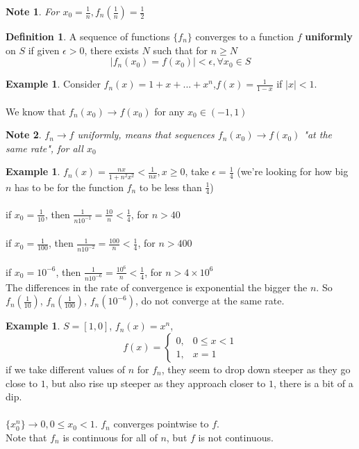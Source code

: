 \documentclass[12pt]{article}
\theoremstyle{plain}
\newtheorem*{note}{Note}
\theoremstyle{definition}
\newtheorem{definition}[theorem]{Definition}
\newtheorem{example}[theorem]{Example}
\begin{document}
\begin{note}
	For $x_0 = \frac{1}{n}, f_n (\frac{1}{n}) = \frac{1}{2}$
\end{note}

\begin{definition}
	A sequence of functions $\{ f_n \}$ converges to a function $f$ \textbf{uniformly} on $S$ if given $\epsilon > 0$, there exists $N$ such that for $n \geq N$
	$$|f_n (x_0) = f(x_0)| < \epsilon, \forall x_0 \in S$$
\end{definition}

\begin{example}
	Consider $f_n (x) = 1+ x + ... + x^n$,$ f(x)=\frac{1}{1-x}$ if $|x| < 1$.\\
	\\
	We know that $f_n (x_0) \to f(x_0)$ for any $x_0 \in (-1, 1)$
\end{example}

\begin{note}
	$f_n \to f$ uniformly, means that sequences $f_n (x_0) \to f(x_0)$ "at the same rate", for all $x_0$
\end{note}

\begin{example}
	$f_n (x) =  \frac{nx}{1 + n^2 x^2} < \frac{1}{nx}, x \geq 0$, take $\epsilon = \frac{1}{4}$
	(we're looking for how big $n$ has to be for the function $f_n$ to be less than $\frac{1}{4}$)\\
	\\
	if $x_0 = \frac{1}{10}$, then $\frac{1}{n 10^{-1}} = \frac{10}{n} < \frac{1}{4}$, for $n > 40$\\
	\\
	if $x_0 = \frac{1}{100}$, then $\frac{1}{n 10^{-2}} = \frac{100}{n} < \frac{1}{4}$, for $n > 400$\\
	\\
	if $x_0 = 10^{-6}$, then $\frac{1}{n 10^{-6}} = \frac{10^6}{n} < \frac{1}{4}$, for $n > 4 \times 10^6$\\
	The differences in the rate of convergence is exponential the bigger the $n$. So $f_n (\frac{1}{10})$, $f_n (\frac{1}{100})$, $f_n (10^{-6})$, do not converge at the same rate.
\end{example}

\begin{example}
	$S = [1,0]$, $f_n (x) = x^n$,
	$$f(x) = \begin{cases}
		0, &0 \leq x < 1\\
		1, &x = 1
	\end{cases}
$$
if we take different values of $n$ for $f_n$, they seem to drop down steeper as they go close to $1$, but also rise up steeper as they approach closer to $1$, there is a bit of a dip.\\
\\
$\{ x_0^n \} \to 0, 0 \leq x_0 < 1$. $f_n$ converges pointwise to $f$.\\
Note that $f_n$ is continuous for all of $n$, but $f$ is not continuous.
\end{example}
\end{document}

